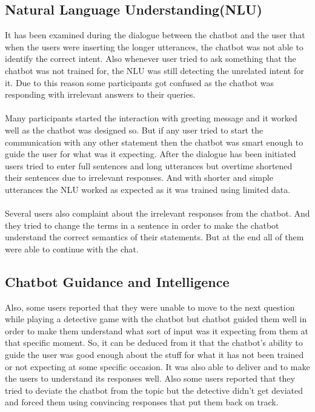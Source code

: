 \subsection{Natural Language Understanding(NLU)}
It has been examined during the dialogue between the chatbot and the user that when the users were inserting the longer utterances, the chatbot was not able to identify the correct intent. Also whenever user tried to ask something that the chatbot was not trained for, the NLU was still detecting the unrelated intent for it. Due to this reason some participants got confused as the chatbot was responding with irrelevant answers to their queries.
\\~\\
Many participants started the interaction with greeting message and it worked well as the chatbot was designed so. But if any user tried to start the communication with any other statement then the chatbot was smart enough to guide the user for what was it expecting. After the dialogue has been initiated users tried to enter full sentences and long utterances but overtime shortened their sentences due to irrelevant responses. And with shorter and simple utterances the NLU worked as expected as it was trained using limited data.
\\~\\
Several users also complaint about the irrelevant responses from the chatbot. And they tried to change the terms in a sentence in order to make the chatbot understand the correct semantics of their statements. But at the end all of them were able to continue with the chat.

\subsection{Chatbot Guidance and Intelligence}
Also, some users reported that they were unable to move to the next question while playing a detective game with the chatbot but chatbot guided them well in order to make them understand what sort of input was it expecting from them at that specific moment. So, it can be deduced from it that the chatbot's ability to guide the user was good enough about the stuff for what it has not been trained or not expecting at some specific occasion. It was also able to deliver and to make the users to understand its responses well. Also some users reported that they tried to deviate the chatbot from the topic but the detective didn't get deviated and forced them using convincing responses that put them back on track.

